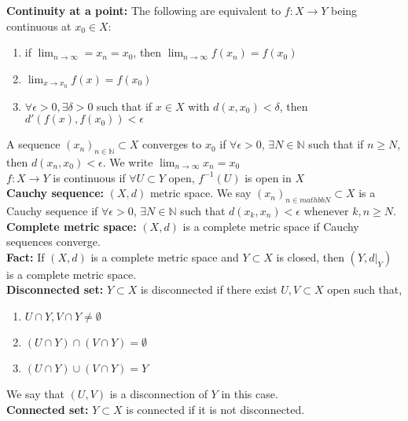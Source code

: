 \documentclass[12pt]{article}
\begin{document}
\textbf{Continuity at a point:} The following are equivalent to $f: X \to Y$ being continuous at $x_0 \in X$:
\begin{enumerate}
\item if $\lim_{n \to \infty} = x_n = x_0$, then $\lim_{n \to \infty} f(x_n) = f(x_0)$
\item $\lim_{x \to x_0} f(x) = f(x_0)$
\item $\forall \epsilon > 0, \exists \delta > 0$ such that if $x \in X$ with $d(x, x_0) < \delta$, then $d'(f(x), f(x_0)) < \epsilon$
\end{enumerate}

A sequence $(x_n)_{n \in \mathbb{N}} \subset X$ converges to $x_0$ if $\forall \epsilon > 0$, $\exists N \in \mathbb{N}$ such that if $n \geq N$, then $d(x_n, x_0) < \epsilon$. We write $\lim_{n \to \infty} x_n = x_0$\\

$f: X \to Y$ is continuous if $\forall U \subset Y$ open, $f^{-1}(U)$ is open in $X$\\

\textbf{Cauchy sequence:} $(X,d)$ metric space. We say $(x_n)_{n \in mathbb{N}} \subset X$ is a Cauchy sequence if $\forall \epsilon > 0$, $\exists N \in \mathbb{N}$ such that $d(x_k, x_n) < \epsilon$ whenever $k, n \geq N$.\\

\textbf{Complete metric space:} $(X, d)$ is a complete metric space if Cauchy sequences converge.\\

\textbf{Fact:} If $(X, d)$ is a complete metric space and $Y \subset X$ is closed, then $(Y, d|_Y)$ is a complete metric space.\\

\textbf{Disconnected set:} $Y \subset X$ is disconnected if there exist $U, V \subset X$ open such that,
\begin{enumerate}
\item $U \cap Y, V \cap Y \neq \emptyset$ 
\item $(U \cap Y) \cap (V \cap Y) = \emptyset$
\item $(U \cap Y) \cup (V \cap Y) = Y$
\end{enumerate}

We say that $(U, V)$ is a disconnection of $Y$ in this case.\\

\textbf{Connected set:} $Y \subset X$ is connected if it is not disconnected.\\
\end{document}
